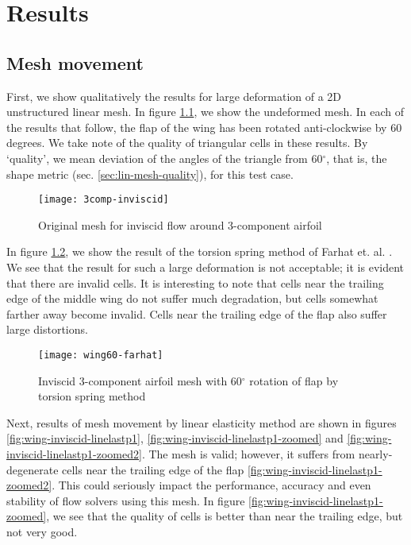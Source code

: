 \chapter{Results}
 
\section{Mesh movement}
 
First, we show qualitatively the results for large deformation of a 2D unstructured linear mesh. In figure \ref{fig:wing-inviscid}, we show the undeformed mesh. In each of the results that follow, the flap of the wing has been rotated anti-clockwise by 60 degrees. We take note of the quality of triangular cells in these results. By `quality', we mean deviation of the angles of the triangle from 60$^\circ$, that is, the shape metric (sec. \ref{sec:lin-mesh-quality}), for this test case.
\begin{figure}
  	\centering
  	\texttt{[image: 3comp-inviscid]}
  	\caption{Original mesh for inviscid flow around 3-component airfoil}
  	\label{fig:wing-inviscid}
\end{figure}

In figure \ref{fig:wing-inviscid-farhat}, we show the result of the torsion spring method of Farhat et. al. \cite{mm:torsionsprings}. We see that the result for such a large deformation is not acceptable; it is evident that there are invalid cells. It is interesting to note that cells near the trailing edge of the middle wing do not suffer much degradation, but cells somewhat farther away become invalid. Cells near the trailing edge of the flap also suffer large distortions.

\begin{figure}
	\centering
	\texttt{[image: wing60-farhat]}
	\caption{Inviscid 3-component airfoil mesh with 60$^\circ$ rotation of flap by torsion spring method}
	\label{fig:wing-inviscid-farhat}
\end{figure}

Next, results of mesh movement by linear elasticity method are shown in figures \ref{fig:wing-inviscid-linelastp1}, \ref{fig:wing-inviscid-linelastp1-zoomed} and \ref{fig:wing-inviscid-linelastp1-zoomed2}. The mesh is valid; however, it suffers from nearly-degenerate cells near the trailing edge of the flap \ref{fig:wing-inviscid-linelastp1-zoomed2}. This could seriously impact the performance, accuracy and even stability of flow solvers using this mesh. In figure \ref{fig:wing-inviscid-linelastp1-zoomed}, we  see that the quality of cells is better than near the trailing edge, but not very good.

